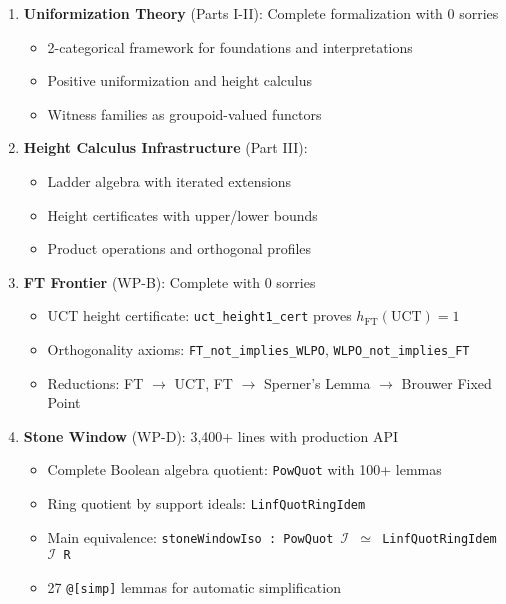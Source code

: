 \documentclass[11pt]{article}
\newcommand{\FT}{\mathrm{FT}}
\newcommand{\UCT}{\mathrm{UCT}}
\begin{document}
\begin{enumerate}
\item \textbf{Uniformization Theory} (Parts I-II): Complete formalization with 0 sorries
   \begin{itemize}
   \item 2-categorical framework for foundations and interpretations
   \item Positive uniformization and height calculus
   \item Witness families as groupoid-valued functors
   \end{itemize}

\item \textbf{Height Calculus Infrastructure} (Part III):
   \begin{itemize}
   \item Ladder algebra with iterated extensions
   \item Height certificates with upper/lower bounds
   \item Product operations and orthogonal profiles
   \end{itemize}

\item \textbf{FT Frontier} (WP-B): Complete with 0 sorries
   \begin{itemize}
   \item UCT height certificate: \texttt{uct\_height1\_cert} proves $h_{\FT}(\UCT) = 1$
   \item Orthogonality axioms: \texttt{FT\_not\_implies\_WLPO}, \texttt{WLPO\_not\_implies\_FT}
   \item Reductions: FT $\to$ UCT, FT $\to$ Sperner's Lemma $\to$ Brouwer Fixed Point
   \end{itemize}

\item \textbf{Stone Window} (WP-D): 3,400+ lines with production API
   \begin{itemize}
   \item Complete Boolean algebra quotient: \texttt{PowQuot} with 100+ lemmas
   \item Ring quotient by support ideals: \texttt{LinfQuotRingIdem}
   \item Main equivalence: \texttt{stoneWindowIso : PowQuot $\mathcal{I}$ $\simeq$ LinfQuotRingIdem $\mathcal{I}$ R}
   \item 27 \texttt{@[simp]} lemmas for automatic simplification
   \end{itemize}
\end{enumerate}
\end{document}
